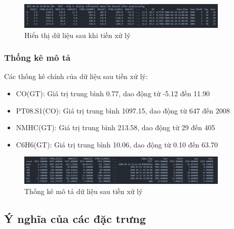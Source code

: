 \begin{figure}[h]
    \centering
    \includegraphics[width=0.9\textwidth]{images/processed_data_preview.png}
    \caption{Hiển thị dữ liệu sau khi tiền xử lý}
    \label{fig:processed_data_preview}
\end{figure}

\subsubsection{Thống kê mô tả}
\hspace{0.5cm}Các thống kê chính của dữ liệu sau tiền xử lý:
\begin{itemize}
    \item CO(GT): Giá trị trung bình 0.77, dao động từ -5.12 đến 11.90
    \item PT08.S1(CO): Giá trị trung bình 1097.15, dao động từ 647 đến 2008
    \item NMHC(GT): Giá trị trung bình 213.58, dao động từ 29 đến 405
    \item C6H6(GT): Giá trị trung bình 10.06, dao động từ 0.10 đến 63.70
\end{itemize}

\begin{figure}[h]
    \centering
    \includegraphics[width=0.9\textwidth]{images/processed_data_statistics.png}
    \caption{Thống kê mô tả dữ liệu sau tiền xử lý}
    \label{fig:processed_data_statistics}
\end{figure}

\subsection{Ý nghĩa của các đặc trưng}

